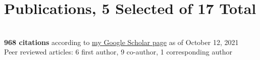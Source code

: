 \documentclass[letterpaper]{twentysecondcv3} %
\begin{document}
\section{Publications, 5 Selected of 17 Total}\\
\textbf{968 citations} according to \href{https://scholar.google.com/citations?user=bgdnUn8AAAAJ&hl=en}{my Google Scholar page} as of October 12, 2021\\
Peer reviewed articles: 6 first author, 9 co-author, 1 corresponding author

\nocite{Michalak2020, Gaby2017, Gaby2014, Gaby2012, Gaby2011}

%
%
%
%

%
%
\end{document}
